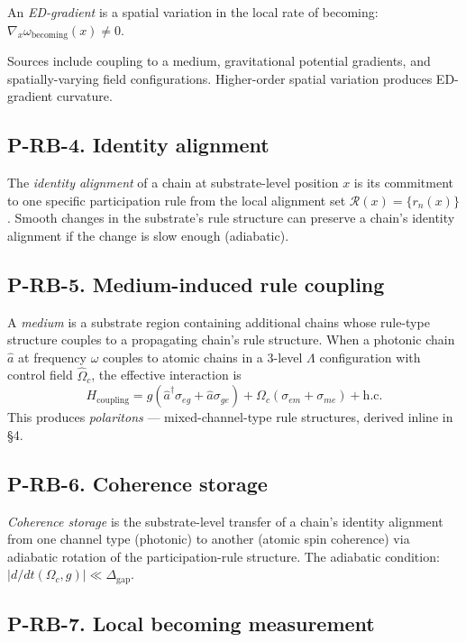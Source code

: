 \documentclass[11pt,a4paper]{article}
\begin{document}
An \emph{ED-gradient} is a spatial variation in the local rate of becoming: $\nabla_x\omega_{\mathrm{becoming}}(x) \neq 0$.

Sources include coupling to a medium, gravitational potential gradients, and spatially-varying field configurations. Higher-order spatial variation produces ED-gradient curvature.

\subsection{P-RB-4. Identity alignment}

The \emph{identity alignment} of a chain at substrate-level position $x$ is its commitment to one specific participation rule from the local alignment set $\mathcal{R}(x) = \{r_n(x)\}$. Smooth changes in the substrate's rule structure can preserve a chain's identity alignment if the change is slow enough (adiabatic).

\subsection{P-RB-5. Medium-induced rule coupling}

A \emph{medium} is a substrate region containing additional chains whose rule-type structure couples to a propagating chain's rule structure. When a photonic chain $\hat a$ at frequency $\omega$ couples to atomic chains in a 3-level $\Lambda$ configuration with control field $\hat\Omega_c$, the effective interaction is
\[
H_{\mathrm{coupling}} = g(\hat a^\dagger\sigma_{eg} + \hat a\sigma_{ge}) + \Omega_c(\sigma_{em} + \sigma_{me}) + \mathrm{h.c.}
\]
This produces \emph{polaritons} --- mixed-channel-type rule structures, derived inline in \S4.

\subsection{P-RB-6. Coherence storage}

\emph{Coherence storage} is the substrate-level transfer of a chain's identity alignment from one channel type (photonic) to another (atomic spin coherence) via adiabatic rotation of the participation-rule structure. The adiabatic condition: $|d/dt(\Omega_c, g)| \ll \Delta_{\mathrm{gap}}$.

\subsection{P-RB-7. Local becoming measurement}
\end{document}
